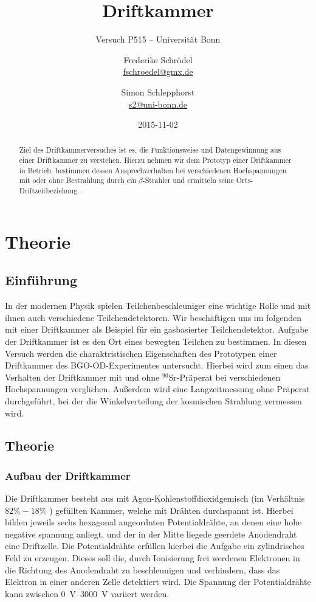 \documentclass[11pt, ngerman, fleqn, DIV=15, headinclude, BCOR=2cm]{scrreprt}
\title{Driftkammer}
\subtitle{Versuch P515 -- Universität Bonn}
\author{
	Frederike Schrödel \\
	\small{\href{mailto:fschroedel@gmx.de}{fschroedel@gmx.de}}
	\and
	Simon Schlepphorst \\
	\small{\href{mailto:s2@uni-bonn.de}{s2@uni-bonn.de}}
}
\date{2015-11-02}
\begin{document}
\maketitle

\begin{abstract}
Ziel des Driftkammerversuches ist es, die Funktionsweise und Datengewinnung aus einer Driftkammer zu verstehen.
Hierzu nehmen wir dem Prototyp einer Driftkammer in Betrieb, 
bestimmen dessen Ansprechverhalten bei verschiedenen Hochspannungen mit oder ohne Bestrahlung durch ein $\beta$-Strahler  
und ermitteln seine Orts-Driftzeitbeziehung.
\end{abstract}

\tableofcontents

\chapter{Theorie}

\section{Einführung}
In der modernen Physik spielen Teilchenbeschleuniger eine wichtige Rolle und mit ihnen auch verschiedene Teilchendetektoren.
Wir beschäftigen uns im folgenden mit einer Driftkammer als Beispiel für ein gasbasierter Teilchendetektor.
Aufgabe der Driftkammer ist es den Ort eines bewegten Teilchen zu bestimmen.
In diesen Versuch werden die charaktristischen Eigenschaften des Prototypen einer Driftkammer des BGO-OD-Experimentes untersucht.
Hierbei wird zum einen das Verhalten der Driftkammer mit und ohne $^90\text{Sr}$-Präperat bei verschiedenen Hochspannungen verglichen.
Außerdem wird eine Langzeitmessung ohne Präperat durchgeführt, bei der die Winkelverteilung der kosmischen Strahlung vermessen wird.

\section{Theorie}
\subsection{Aufbau der Driftkammer}
Die Driftkammer besteht aus mit Agon-Kohlenstoffdioxidgemisch (im Verhältnis $ 82\%-18\% $ ) gefüllten Kammer, welche mit Drähten durchspannt ist. 
Hierbei bilden jeweils sechs hexagonal angeordnten Potentialdrähte, an denen
eine hohe negative spannung anliegt, und der in der Mitte liegede geerdete Anodendraht eine Driftzelle.
Die Potentialdrähte erfüllen hierbei die Aufgabe ein zylindrisches Feld zu erzeugen. 
Dieses soll die, durch Ionisierung frei werdenen Elektronen in die Richtung
des Anodendraht zu beschleunigen und verhindern, dass das Elektron in einer anderen Zelle detektiert wird.
Die Spannung der Potentialdrähte kann zwischen \SIrange{0}{3000}{\volt} variiert werden.
\end{document}
